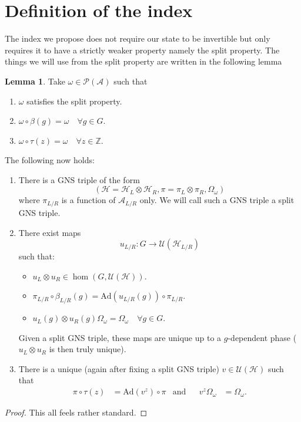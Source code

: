 \documentclass[12pt,a4paper,twoside]{article}
\newcommand{\UU}{\mathcal U}
\newcommand{\PP}{\mathcal P}
\newcommand{\HH}{\mathcal H}
\newcommand{\ZZ}{\mathbb Z}
\renewcommand{\AA}{\mathcal A}
\newcommand{\Ad}{\textrm{Ad}}
\theoremstyle{definition}
\newtheorem{lemma}[theorem]{Lemma}
\numberwithin{equation}{section}
\begin{document}
\section{Definition of the index}
The index we propose does not require our state to be invertible but only requires it to have a strictly weaker property namely the split property. The things we will use from the split property are written in the following lemma
\begin{lemma}
	Take $\omega\in\PP(\AA)$ such that
	\begin{enumerate}
		\item $\omega$ satisfies the split property.
		\item $\omega\circ\beta(g)=\omega\quad\forall g\in G$.
		\item $\omega\circ\tau(z)=\omega\quad\forall z\in\ZZ$.
	\end{enumerate}
	The following now holds:
	\begin{enumerate}
		\item There is a GNS triple of the form
		\begin{equation}
			(\HH=\HH_L\otimes\HH_R,\pi=\pi_L\otimes\pi_R,\Omega_\omega)
		\end{equation}
		where $\pi_{L/R}$ is a function of $\AA_{L/R}$ only. We will call such a GNS triple a split GNS triple.
		\item There exist maps
		\begin{equation}
			u_{L/R}:G\rightarrow\UU(\HH_{L/R})
		\end{equation}
		such that:
		\begin{itemize}
			\item $u_L\otimes u_R\in\hom(G,\UU(\HH))$.
			\item $\pi_{L/R}\circ \beta_{L/R}(g)=\Ad(u_{L/R}(g))\circ\pi_{L/R}$.
			\item $u_L(g)\otimes u_R(g)\Omega_\omega=\Omega_\omega\quad\forall g\in G$.
		\end{itemize}
		Given a split GNS triple, these maps are unique up to a $g$-dependent phase ($u_L\otimes u_R$ is then truly unique).
		\item There is a unique (again after fixing a split GNS triple) $v\in\UU(\HH)$ such that
		\begin{align}
			\pi\circ\tau(z)&=\Ad(v^z)\circ\pi&\text{and}&&v^z\Omega_\omega&=\Omega_\omega.
		\end{align}
	\end{enumerate}
\end{lemma}
\begin{proof}
	This all feels rather standard.
\end{proof}
\end{document}
